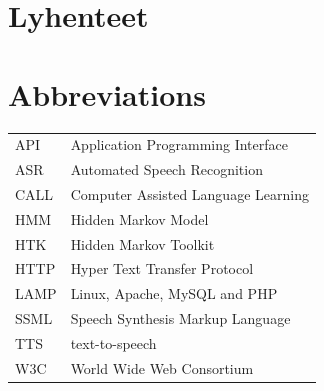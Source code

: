 \documentclass[11pt,a4paper,oneside,article]{memoir}
\begin{document}


\pagestyle{empty} %
\tableofcontents*
\pagestyle{empty} %
\clearpage
\pagestyle{plain}




\pagestyle{empty}
\setlength{\parskip}{1cm}
 {
  \chapter*{Lyhenteet}
} {
  \chapter*{Abbreviations}
}
\begin{table}[h]
\setlength{\tabcolsep}{8pt}
\renewcommand{\arraystretch}{2}
\begin{tabular}{l p{12cm}}

API & Application Programming Interface\\
ASR & Automated Speech Recognition\\
CALL & Computer Assisted Language Learning\\
HMM & Hidden Markov Model\\
HTK & Hidden Markov Toolkit\\
HTTP & Hyper Text Transfer Protocol \\
LAMP & Linux, Apache, MySQL and PHP \\
SSML & Speech Synthesis Markup Language\\
TTS & text-to-speech\\
W3C & World Wide Web Consortium \\

\end{tabular}
\end{table}
\end{document}
